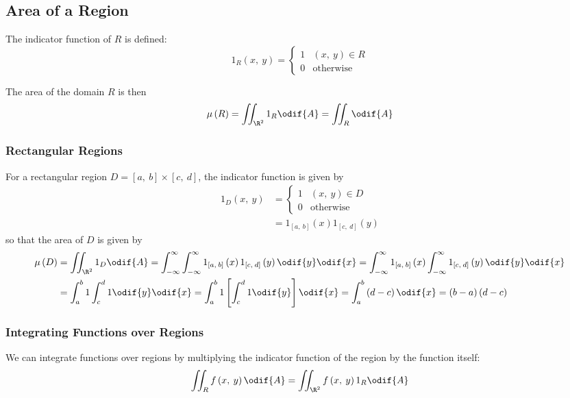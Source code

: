 \documentclass{article}
\begin{document}
\subsection{Area of a Region}
\begin{definition}
    The indicator function of \(R\) is defined:
    \begin{equation*}
        1_R\left( x,\: y \right) =
        \begin{cases}
            1 & \left( x,\: y \right) \in R \\
            0 & \text{otherwise}
        \end{cases}
    \end{equation*}
\end{definition}
The area of the domain \(R\) is then
\begin{equation*}
    \mu\left( R \right) = \iint_{\R^2} 1_R \odif{A} = \iint_R \odif{A}
\end{equation*}
\subsubsection{Rectangular Regions}
For a rectangular region \(D = \left[ a,\: b \right] \times \left[ c,\:
d \right]\), the indicator function is given by
\begin{align*}
    1_D\left( x,\: y \right) & =
    \begin{cases}
        1 & \left( x,\: y \right) \in D \\
        0 & \text{otherwise}
    \end{cases}
    \\
                             & = 1_{\left[ a,\: b \right]} \left( x \right) 1_{\left[ c,\: d \right]} \left( y \right)
\end{align*}
so that the area of \(D\) is given by
\begin{align*}
    \mu\left( D \right) & = \iint_{\R^2} 1_D \odif{A} = \int_{-\infty}^\infty \int_{-\infty}^\infty 1_{\left[ a,\: b \right]} \left( x \right) 1_{\left[ c,\: d \right]} \left( y \right) \odif{y} \odif{x} = \int_{-\infty}^\infty 1_{\left[ a,\: b \right]} \left( x \right) \int_{-\infty}^\infty 1_{\left[ c,\: d \right]} \left( y \right) \odif{y} \odif{x} \\
                        & = \int_a^b 1 \int_c^d 1 \odif{y} \odif{x} = \int_a^b 1 \left[ \int_c^d 1 \odif{y} \right] \odif{x} = \int_a^b \left( d - c \right) \odif{x} = \left( b - a \right) \left( d - c \right)
\end{align*}
\subsubsection{Integrating Functions over Regions}
We can integrate functions over regions by multiplying the indicator
function of the region by the function itself:
\begin{equation*}
    \iint_R f\left( x,\: y \right) \odif{A} = \iint_{\R^2} f\left( x,\: y \right) 1_R \odif{A}
\end{equation*}
\end{document}
